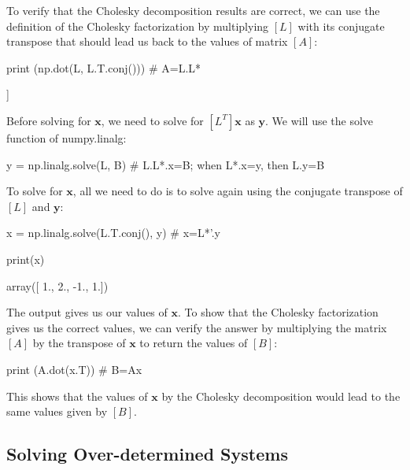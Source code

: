 To verify that the Cholesky decomposition results are correct, we can use the definition of the Cholesky factorization by multiplying $[L]$ with its conjugate transpose that should lead us back to the values of matrix $[A]$:

\begin{ipythonnon}
print (np.dot(L, L.T.conj())) # A=L.L* 
\end{ipythonnon}
\begin{ioutput}
[[ 10. -1.  2   0.]
 [ -1. 11. -1.  3.] 
 [  2. -1. 10. -1.] 
 [  0.  3. -1.  8.]]
\end{ioutput}

Before solving for $\boldsymbol{x}$, we need to solve for $[L^T]\boldsymbol{x}$ as $\boldsymbol{y}$. We will use the solve function of numpy.linalg:

\begin{ipythonnon}
y = np.linalg.solve(L, B) # L.L*.x=B; when L*.x=y, then L.y=B
\end{ipythonnon}

To solve for $\boldsymbol{x}$, all we need to do is to solve again using the conjugate transpose of $[L]$ and $\boldsymbol{y}$:

\begin{ipythonnon}
x = np.linalg.solve(L.T.conj(), y) # x=L*'.y

print(x)
\end{ipythonnon}
\begin{ioutput}
array([ 1.,  2., -1.,  1.])
\end{ioutput}
The output gives us our values of $\boldsymbol{x}$. To show that the Cholesky factorization gives us the correct values, we can verify the answer by multiplying the matrix $[A]$ by the transpose of $\boldsymbol{x}$ to return the values of $[B]$:
\begin{ipythonnon}
print (A.dot(x.T)) # B=Ax 
\end{ipythonnon}
\begin{ioutput}
[  6.  25. -11.  15.]
\end{ioutput}

This shows that the values of $\boldsymbol{x}$ by the Cholesky decomposition would lead to the same values given by $[B]$.

\subsection{Solving Over-determined Systems}
\label{using-the-pseudoinverse-to-solve-a-overdetermined-system-of-linear-equations}

